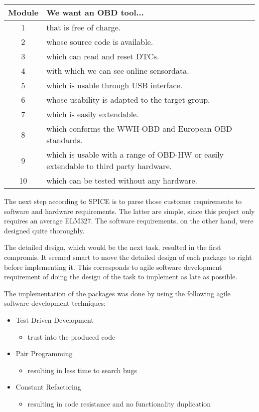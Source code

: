 \begin{tabular}{| c | p{12cm} |}
 \hline
 \textbf{Module} & \textbf{We want an OBD tool...} \\
  \hline
  1 & that is free of charge. \\
  \hline
  2 & whose source code is available. \\
  \hline
  3 & which can read and reset DTCs. \\
  \hline
  4 & with which we can see online sensordata. \\
  \hline
  5 & which is usable through USB interface. \\
  \hline
  6 & whose usability is adapted to the target group. \\
  \hline
  7 & which is easily extendable. \\
  \hline
  8 & which conforms the WWH-OBD and European OBD standards. \\
  \hline
  9 & which is usable with a range of OBD-HW or easily extendable to third party hardware. \\
  \hline
  10 & which can be tested without any hardware. \\
  \hline
\end{tabular}


The next step according to SPICE is to parse those customer requirements to software and hardware requirements. The latter are simple, since 
this project only requires an average ELM327. The software requirements, on the other hand, were designed quite thoroughly.


The detailed design, which would be the next task, resulted in the first compromis. It seemed smart to move the detailed design of each package 
to right before implementing it. This corresponds to agile software development requirement of doing the design of the task to implement as late 
as possible.

The implementation of the packages was done by using the following agile software development techniques:


\begin{itemize}
 \item Test Driven Development
 \begin{itemize}
  \item trust into the produced code
 \end{itemize}

 \item Pair Programming
 \begin{itemize}
  \item resulting in less time to search bugs
 \end{itemize}
 
 \item Constant Refactoring
 \begin{itemize}
  \item resulting in code resistance and no functionality duplication
 \end{itemize}
\end{itemize}


